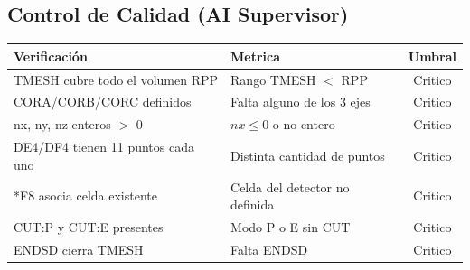 \documentclass[12pt,a4paper]{article}
\begin{document}
\begin{tcolorbox}[aiSupervisor]

\begin{tcolorbox}[aiSupervisor]
\subsection*{Control de Calidad (AI Supervisor)}

\begin{table}[H]
\centering
\begin{tabular}{llc}
\toprule
\textbf{Verificación} & \textbf{Metrica} & \textbf{Umbral} \\
\midrule
TMESH cubre todo el volumen RPP & Rango TMESH $<$ RPP & Critico \\
CORA/CORB/CORC definidos & Falta alguno de los 3 ejes & Critico \\
nx, ny, nz enteros $>$ 0 & $nx \leq 0$ o no entero & Critico \\
DE4/DF4 tienen 11 puntos cada uno & Distinta cantidad de puntos & Critico \\
*F8 asocia celda existente & Celda del detector no definida & Critico \\
CUT:P y CUT:E presentes & Modo P o E sin CUT & Critico \\
ENDSD cierra TMESH & Falta ENDSD & Critico \\
\bottomrule
\end{tabular}
\end{table}

\newpage


\newpage


\newpage


\newpage

\end{tcolorbox}
\end{tcolorbox}
\end{document}
